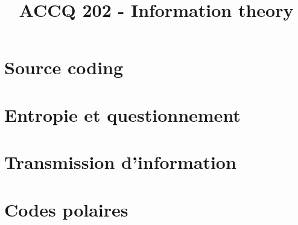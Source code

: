 \documentclass[a4paper,12pt]{article}
\title{\vspace{-1.2cm} \textbf{ACCQ 202 - Information theory}}
\begin{document}
\maketitle

\vspace{-1.5cm}

\section{Source coding}

	

\section{Entropie et questionnement}

	

\section{Transmission d'information}

	

\section{Codes polaires}

	
\end{document}
